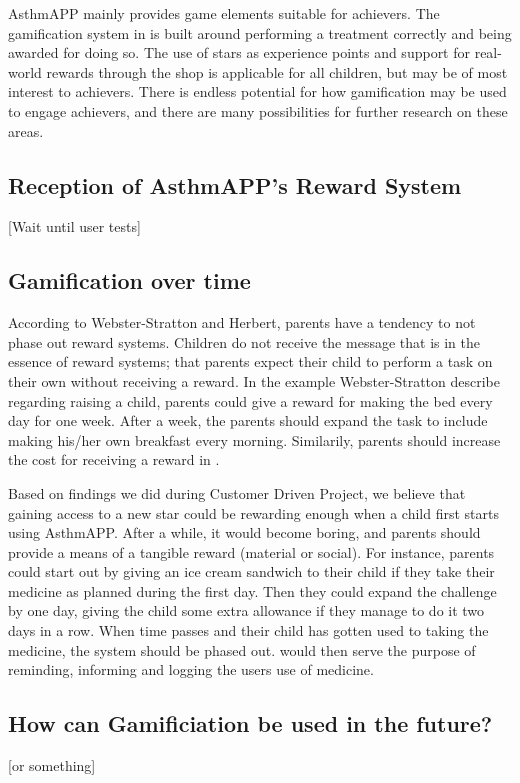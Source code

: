 AsthmAPP mainly provides game elements suitable for achievers. The gamification system in \app{} is built around performing a treatment correctly and being awarded for doing so. The use of stars as experience points and support for real-world rewards through the shop is applicable for all children, but may be of most interest to achievers. There is endless potential for how gamification may be used to engage achievers, and there are many possibilities for further research on these areas. 


\subsection{Reception of AsthmAPP's Reward System}
[Wait until user tests]

\subsection{Gamification over time}
\label{sec:gamificationovertime}
According to Webster-Stratton and Herbert, parents have a tendency to not phase out reward systems\cite{webster1994troubled}. Children do not receive the message that is in the essence of reward systems; that parents expect their child to perform a task on their own without receiving a reward. In the example Webster-Stratton \etal{} describe regarding raising a child, parents could give a reward for making the bed every day for one week. After a week, the parents should expand the task to include making his/her own breakfast every morning. Similarily, parents should increase the cost for receiving a reward in \app{}.  

Based on findings we did during Customer Driven Project\cite{CustomerDriven}, we believe that gaining access to a new star could be rewarding enough when a child first starts using AsthmAPP. After a while, it would become boring, and parents should provide a means of a tangible reward (material or social). For instance, parents could start out by giving an ice cream sandwich to their child if they take their medicine as planned during the first day. Then they could expand the challenge by one day, giving the child some extra allowance if they manage to do it two days in a row. When time passes and their child has gotten used to taking the medicine, the system should be phased out. \app{} would then serve the purpose of reminding, informing and logging the users use of medicine.

\subsection{How can Gamificiation be used in the future?}
[or something]


